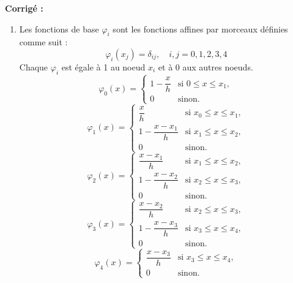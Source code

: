 \documentclass[a4paper,12pt]{article}
\newif\ifcorriges
\newenvironment{solution}
  {
    \ifcorriges
      \begin{framed}
      \par\noindent\textbf{Corrigé :} 
  }
  {
      \end{framed}
    \fi
  }
\begin{document}
\begin{enumerate}
\begin{solution}
        \begin{enumerate}
            \item Les fonctions de base \( \varphi_i \) sont les fonctions affines par morceaux définies comme suit :
            \[
            \varphi_i(x_j) = \delta_{ij}, \quad i,j = 0,1,2,3,4
            \]
            Chaque \( \varphi_i \) est égale à 1 au noeud \( x_i \) et à 0 aux autres noeuds.
                \[
                \varphi_0(x) =
                \begin{cases}
                    1 - \dfrac{x}{h} & \text{si } 0 \leq x \leq x_1, \\
                    0 & \text{sinon}.
                \end{cases}
                \]
                \[
                \varphi_1(x) =
                \begin{cases}
                    \dfrac{x}{h} & \text{si } x_0 \leq x \leq x_1, \\
                    1 - \dfrac{x - x_1}{h} & \text{si } x_1 \leq x \leq x_2, \\
                    0 & \text{sinon}.
                \end{cases}
                \]
                \[
                \varphi_2(x) =
                \begin{cases}
                    \dfrac{x - x_1}{h} & \text{si } x_1 \leq x \leq x_2, \\
                    1 - \dfrac{x - x_2}{h} & \text{si } x_2 \leq x \leq x_3, \\
                    0 & \text{sinon}.
                \end{cases}
                \]
                \[
                \varphi_3(x) =
                \begin{cases}
                    \dfrac{x - x_2}{h} & \text{si } x_2 \leq x \leq x_3, \\
                    1 - \dfrac{x - x_3}{h} & \text{si } x_3 \leq x \leq x_4, \\
                    0 & \text{sinon}.
                \end{cases}
                \]
                \[
                \varphi_4(x) =
                \begin{cases}
                    \dfrac{x - x_3}{h} & \text{si } x_3 \leq x \leq x_4, \\
                    0 & \text{sinon}.
                \end{cases}
                \]


\end{enumerate}
\end{solution}
\end{enumerate}
\end{document}

